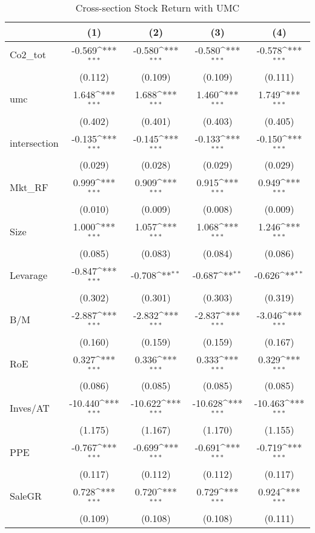 \begin{table}[]
\caption{Cross-section Stock Return with UMC}
\label{tab: firm_umc}
{
\def\sym#1{\ifmmode^{#1}\else\(^{#1}\)\fi}
\begin{tabular}{@{\extracolsep{2pt}}l*{4}{c}@{}}
\hline\hline


 & (1) & (2) & (3) & (4) \\
\hline
Co2\_tot & -0.569\sym{***} & -0.580\sym{***} & -0.580\sym{***} & -0.578\sym{***} \\
 & (0.112) & (0.109) & (0.109) & (0.111) \\
umc & 1.648\sym{***} & 1.688\sym{***} & 1.460\sym{***} & 1.749\sym{***} \\
 & (0.402) & (0.401) & (0.403) & (0.405) \\
intersection & -0.135\sym{***} & -0.145\sym{***} & -0.133\sym{***} & -0.150\sym{***} \\
 & (0.029) & (0.028) & (0.029) & (0.029) \\
Mkt\_RF & 0.999\sym{***} & 0.909\sym{***} & 0.915\sym{***} & 0.949\sym{***} \\
 & (0.010) & (0.009) & (0.008) & (0.009) \\
Size & 1.000\sym{***} & 1.057\sym{***} & 1.068\sym{***} & 1.246\sym{***} \\
 & (0.085) & (0.083) & (0.084) & (0.086) \\
Levarage & -0.847\sym{***} & -0.708\sym{**} & -0.687\sym{**} & -0.626\sym{**} \\
 & (0.302) & (0.301) & (0.303) & (0.319) \\
B/M & -2.887\sym{***} & -2.832\sym{***} & -2.837\sym{***} & -3.046\sym{***} \\
 & (0.160) & (0.159) & (0.159) & (0.167) \\
RoE & 0.327\sym{***} & 0.336\sym{***} & 0.333\sym{***} & 0.329\sym{***} \\
 & (0.086) & (0.085) & (0.085) & (0.085) \\
Inves/AT & -10.440\sym{***} & -10.622\sym{***} & -10.628\sym{***} & -10.463\sym{***} \\
 & (1.175) & (1.167) & (1.170) & (1.155) \\
PPE & -0.767\sym{***} & -0.699\sym{***} & -0.691\sym{***} & -0.719\sym{***} \\
 & (0.117) & (0.112) & (0.112) & (0.117) \\
SaleGR & 0.728\sym{***} & 0.720\sym{***} & 0.729\sym{***} & 0.924\sym{***} \\
 & (0.109) & (0.108) & (0.108) & (0.111) \\

\end{tabular}}
\end{table}
